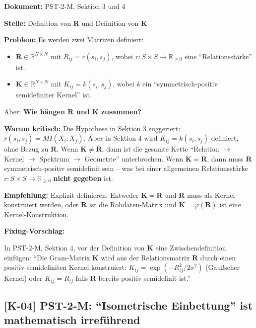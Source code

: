 \documentclass[11pt,a4paper]{article}
\newcommand{\K}[1]{\textbf{[K-#1]}}
\newcommand{\Dok}[1]{\noindent\textbf{Dokument:} #1\par\smallskip}
\newcommand{\Stelle}[1]{\noindent\textbf{Stelle:} #1\par\smallskip}
\newcommand{\Prob}[1]{\noindent\textbf{Problem:} #1\par\smallskip}
\newcommand{\Krit}[1]{\noindent\textbf{Warum kritisch:} #1\par\smallskip}
\newcommand{\Empf}[1]{\noindent\textbf{Empfehlung:} #1\par\smallskip}
\newenvironment{Fix}
  {\par\medskip\noindent\textbf{Fixing-Vorschlag:}\par\nobreak\smallskip}
  {\par\medskip}
\begin{document}
\Dok{PST-2-M, Sektion 3 und 4}
\Stelle{Definition von \textbf{R} und Definition von \textbf{K}}
\Prob{Es werden zwei Matrizen definiert:
\begin{itemize}
  \item $\mathbf{R} \in \mathbb{R}^{N \times N}$ mit $R_{ij} = r(s_i, s_j)$,
    wobei $r: S \times S \to \mathbb{R}_{\geq 0}$ eine ``Relationsstärke'' ist.
  \item $\mathbf{K} \in \mathbb{R}^{N \times N}$ mit $K_{ij} = k(s_i, s_j)$,
    wobei $k$ ein ``symmetrisch-positiv semidefiniter Kernel'' ist.
\end{itemize}
Aber: \textbf{Wie hängen $\mathbf{R}$ und $\mathbf{K}$ zusammen?}}
\Krit{Die Hypothese in Sektion 3 suggeriert: $r(s_i, s_j) = MI(X_i; X_j)$.
Aber in Sektion 4 wird $K_{ij} = k(s_i, s_j)$ definiert, ohne Bezug zu
$\mathbf{R}$. Wenn $\mathbf{K} \neq \mathbf{R}$, dann ist die gesamte
Kette ``Relation $\to$ Kernel $\to$ Spektrum $\to$ Geometrie''
unterbrochen. Wenn $\mathbf{K} = \mathbf{R}$, dann muss $\mathbf{R}$
symmetrisch-positiv semidefinit sein -- was bei einer allgemeinen
Relationsstärke $r: S \times S \to \mathbb{R}_{\geq 0}$ \textbf{nicht
gegeben} ist.}
\Empf{Explizit definieren: Entweder $\mathbf{K} = \mathbf{R}$ und
$\mathbf{R}$ muss als Kernel konstruiert werden, oder $\mathbf{R}$ ist
die Rohdaten-Matrix und $\mathbf{K} = \varphi(\mathbf{R})$ ist eine
Kernel-Konstruktion.}
\begin{Fix}
In PST-2-M, Sektion 4, vor der Definition von $\mathbf{K}$ eine
Zwischendefinition einfügen: ``Die Gram-Matrix $\mathbf{K}$ wird aus
der Relationsmatrix $\mathbf{R}$ durch einen positiv-semidefiniten
Kernel konstruiert: $K_{ij} = \exp(-R_{ij}^2 / 2\sigma^2)$
(Gaußscher Kernel) oder $K_{ij} = R_{ij}$ falls $\mathbf{R}$ bereits
positiv semidefinit ist.''
\end{Fix}

\subsection{\K{04} PST-2-M: ``Isometrische Einbettung'' ist mathematisch irreführend}
\end{document}
